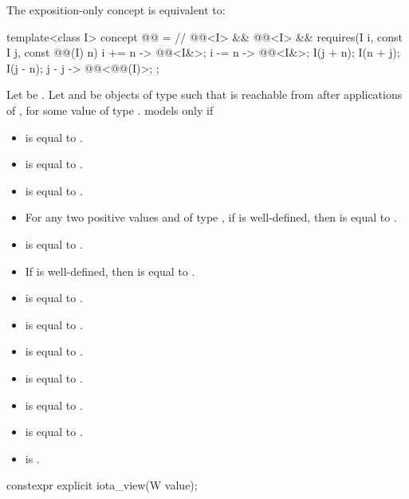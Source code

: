 \pnum
The exposition-only  concept is equivalent to:
\begin{itemdecl}
template<class I>
  concept @@ =                 // \expos
    @@<I> && @@<I> &&
    requires(I i, const I j, const @@(I) n) {
      { i += n } -> @@<I&>;
      { i -= n } -> @@<I&>;
      I(j + n);
      I(n + j);
      I(j - n);
      { j - j } -> @@<@@(I)>;
    };
\end{itemdecl}

Let  be .
Let  and  be objects of type  such that
 is reachable from 
after  applications of ,
for some value  of type .
 models  only if
\begin{itemize}
\item {} is equal to .
\item {} is equal to .
\item {} is equal to .
\item For any two positive values
   and  of type ,
  if  is well-defined, then
   is equal to .
\item {} is equal to .
\item If  is well-defined, then
   is equal to .
\item {} is equal to .
\item {} is equal to .
\item {} is equal to .
\item {} is equal to .
\item {} is equal to .
\item {} is equal to .
\item {} is .
\end{itemize}

%
\begin{itemdecl}
constexpr explicit iota_view(W value);
\end{itemdecl}

